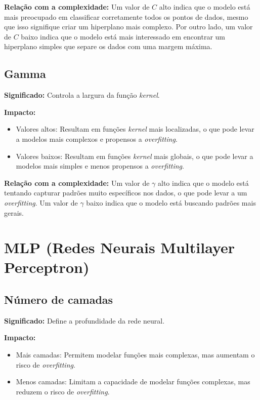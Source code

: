 \documentclass[12pt,a4paper,oneside,openany]{article}
\begin{document}
\noindent\textbf{Relação com a complexidade:}  
Um valor de \(C\) alto indica que o modelo está mais preocupado em classificar corretamente todos os pontos de dados, mesmo que isso signifique criar um hiperplano mais complexo. Por outro lado, um valor de \(C\) baixo indica que o modelo está mais interessado em encontrar um hiperplano simples que separe os dados com uma margem máxima.

\subsection*{Gamma}
\noindent\textbf{Significado:} Controla a largura da função \textit{kernel}.  

\noindent\textbf{Impacto:}
\begin{itemize}
    \item Valores altos: Resultam em funções \textit{kernel} mais localizadas, o que pode levar a modelos mais complexos e propensos a \textit{overfitting}.
    \item Valores baixos: Resultam em funções \textit{kernel} mais globais, o que pode levar a modelos mais simples e menos propensos a \textit{overfitting}.
\end{itemize}

\noindent\textbf{Relação com a complexidade:}  
Um valor de \(\gamma\) alto indica que o modelo está tentando capturar padrões muito específicos nos dados, o que pode levar a um \textit{overfitting}. Um valor de \(\gamma\) baixo indica que o modelo está buscando padrões mais gerais.

\section*{MLP (Redes Neurais Multilayer Perceptron)}

\subsection*{Número de camadas}
\noindent\textbf{Significado:} Define a profundidade da rede neural.  

\noindent\textbf{Impacto:}
\begin{itemize}
    \item Mais camadas: Permitem modelar funções mais complexas, mas aumentam o risco de \textit{overfitting}.
    \item Menos camadas: Limitam a capacidade de modelar funções complexas, mas reduzem o risco de \textit{overfitting}.
\end{itemize}
\end{document}
